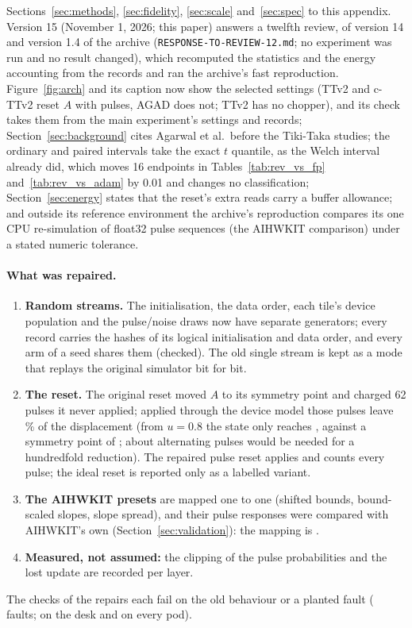Sections~\ref{sec:methods}, \ref{sec:fidelity}, \ref{sec:scale} and~\ref{sec:spec} to this appendix.
Version 15 (November 1, 2026; this paper) answers a twelfth review, of version 14 and version 1.4 of the archive
(\texttt{RESPONSE-TO-REVIEW-12.md}; no experiment was run and no result changed), which recomputed the statistics and the
energy accounting from the records and ran the archive's fast reproduction. Figure~\ref{fig:arch} and its caption now
show the selected settings (TTv2 and c-TTv2 reset $A$ with pulses, AGAD does not; TTv2 has no chopper), and its check takes
them from the main experiment's settings and records; Section~\ref{sec:background} cites Agarwal et al.\ before the
Tiki-Taka studies; the ordinary and paired intervals take the exact $t$ quantile, as the Welch interval already did, which
moves 16 endpoints in Tables~\ref{tab:rev_vs_fp} and~\ref{tab:rev_vs_adam} by 0.01 and changes no classification;
Section~\ref{sec:energy} states that the reset's extra reads carry a buffer allowance; and outside its reference
environment the archive's reproduction compares its one CPU re-simulation of float32 pulse sequences (the AIHWKIT
comparison) under a stated numeric tolerance.

\paragraph{What was repaired.}
\begin{enumerate}
\item \textbf{Random streams.} The initialisation, the data order, each tile's device population and the pulse/noise draws now
      have separate generators; every record carries the hashes of its logical initialisation and data order, and every arm
      of a seed shares them (checked). The old single stream is kept as a mode that replays the original simulator bit for bit.
\item \textbf{The reset.} The original reset moved $A$ to its symmetry point and charged 62 pulses it never applied; applied
      through the device model those pulses leave \RVresetResidPct\,\% of the displacement (from $u=0.8$ the state only reaches
      \RVresetAfter, against a symmetry point of \RVresetSp; about \RVresetPulsesHundredfold{} alternating pulses would be needed
      for a hundredfold reduction). The repaired pulse reset applies and counts every pulse; the ideal reset is reported only
      as a labelled variant.
\item \textbf{The AIHWKIT presets} are mapped one to one (shifted bounds, bound-scaled slopes, slope spread), and their pulse
      responses were compared with AIHWKIT's own (Section~\ref{sec:validation}): the mapping is \RVaihwAccepted.
\item \textbf{Measured, not assumed:} the clipping of the pulse probabilities and the lost update are recorded per layer.
\end{enumerate}
The \RVnChecks{} checks of the repairs each fail on the old behaviour or a planted fault (\RVnFaults{} faults; \RVtestsAllOk{}
on the desk and on every pod).

